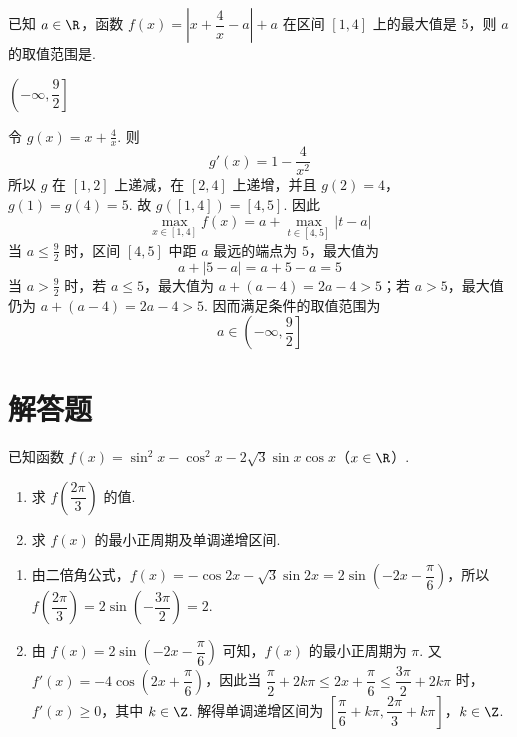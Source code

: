\begin{problem}
已知 \(a\in\R\)，函数 \(f(x)=\left|x+\dfrac{4}{x}-a\right|+a\) 在区间 \([1,4]\) 上的最大值是 5，则 \(a\) 的取值范围是\fillinblank{}.
\end{problem}

\begin{answer}
\(\left(-\infty,\dfrac{9}{2}\right]\)
\end{answer}

\begin{solution}
令 \(g(x)=x+\frac{4}{x}\). 则
\[
g'(x)=1-\frac4{x^2}
\]
所以 \(g\) 在 \([1,2]\) 上递减，在 \([2,4]\) 上递增，并且
\(g(2)=4\)，\(g(1)=g(4)=5\).
故 \(g([1,4])=[4,5]\). 因此
\[
\max_{x\in[1,4]}f(x)=a+\max_{t\in[4,5]}|t-a|
\]
当 \(a\leq\frac{9}{2}\) 时，区间 \([4,5]\) 中距 \(a\) 最远的端点为 \(5\)，最大值为
\[
a+|5-a|=a+5-a=5
\]
当 \(a>\frac{9}{2}\) 时，若 \(a\leq5\)，最大值为 \(a+(a-4)=2a-4>5\)；若 \(a>5\)，最大值仍为 \(a+(a-4)=2a-4>5\). 因而满足条件的取值范围为
\[
a\in\left(-\infty,\frac92\right]
\]
\end{solution}

\section{解答题}

\begin{problem}
已知函数 \(f(x)=\sin^2x-\cos^2x-2\sqrt3\sin x\cos x\)（\(x\in\R\)）.

\begin{enumerate}
\item 求 \(f\left(\dfrac{2\pi}{3}\right)\) 的值.
\item 求 \(f(x)\) 的最小正周期及单调递增区间.
\end{enumerate}
\end{problem}

\begin{solution}
\begin{enumerate}
\item 由二倍角公式，\(f(x)=-\cos 2x-\sqrt{3}\sin 2x=2\sin\left(-2x-\dfrac{\pi}{6}\right)\)，所以
\(f\left(\dfrac{2\pi}{3}\right)=2\sin\left(-\dfrac{3\pi}{2}\right)=2\).
\item 由 \(f(x)=2\sin\left(-2x-\dfrac{\pi}{6}\right)\) 可知，\(f(x)\) 的最小正周期为 \(\pi\). 又 \(f'(x)=-4\cos\left(2x+\dfrac{\pi}{6}\right)\)，因此当 \(\dfrac{\pi}{2}+2k\pi\leq 2x+\dfrac{\pi}{6}\leq\dfrac{3\pi}{2}+2k\pi\) 时，\(f'(x)\geq0\)，其中 \(k\in\Z\). 解得单调递增区间为 \(\left[\dfrac{\pi}{6}+k\pi,\dfrac{2\pi}{3}+k\pi\right]\)，\(k\in\Z\).
\end{enumerate}
\end{solution}

